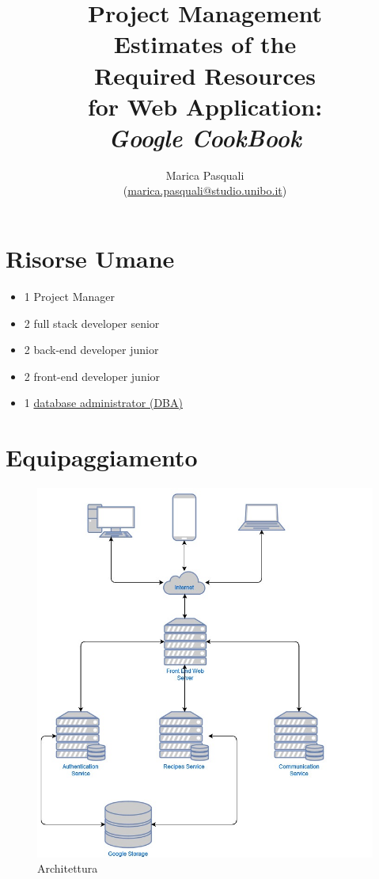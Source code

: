 \documentclass{article}
\title{
    Project Management \\
    \textbf{ 
        Estimates of the \\ 
        Required Resources \\ 
        for Web Application: \\
        \textit{Google CookBook}
    }
}
\author{
    Marica Pasquali \\ 
    (\href{mailto:marica.pasquali@studio.unibo.it}{marica.pasquali@studio.unibo.it})
}
\begin{document}
\maketitle
\newpage \tableofcontents \newpage

\section{Risorse Umane}

\begin{itemize}
    \item 1 Project Manager 
    \item 2 full stack developer senior 
    \item 2 back-end developer junior
    \item 2 front-end developer junior
    \item 1 \href{https://en.wikipedia.org/wiki/Database_administrator}{database administrator (DBA)} 
\end{itemize}


\section{Equipaggiamento}


\begin{figure}[htbp]
    \centering
    \includegraphics[scale=0.7]{./imgs/pm-architecture.jpg}
    \caption{Architettura}
\end{figure}
\end{document}
